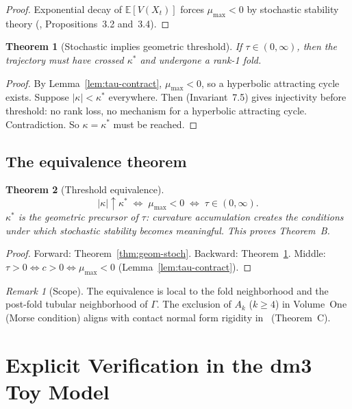 \documentclass[12pt, oneside]{book}
\theoremstyle{plain}
\newtheorem{theorem}{Theorem}[section]
\theoremstyle{definition}
\theoremstyle{remark}
\newtheorem{remark}{Remark}[section]
\newcommand{\Orb}{\Gamma}
\begin{document}
\begin{proof}
Exponential decay of $\mathbb{E}[V(X_t)]$ forces $\mu_{\max}<0$
by stochastic stability theory
(\cite{Paper1}, Propositions~3.2 and~3.4).
\end{proof}

\begin{theorem}[Stochastic implies geometric threshold]
\label{thm:stoch-geom}
If $\tau\in(0,\infty)$, then the trajectory must have crossed
$\kappa^*$ and undergone a rank-1 fold.
\end{theorem}

\begin{proof}
By Lemma~\ref{lem:tau-contract}, $\mu_{\max}<0$, so a hyperbolic
attracting cycle exists. Suppose $|\kappa|<\kappa^*$ everywhere.
Then \cite{PO1} (Invariant~7.5) gives injectivity before threshold:
no rank loss, no mechanism for a hyperbolic attracting cycle.
Contradiction. So $\kappa=\kappa^*$ must be reached.
\end{proof}

\subsection{The equivalence theorem}

\begin{theorem}[Threshold equivalence]
\label{thm:equiv}
\[
  |\kappa|\uparrow\kappa^*
  \;\iff\;
  \mu_{\max}<0
  \;\iff\;
  \tau\in(0,\infty).
\]
$\kappa^*$ is the geometric precursor of $\tau$: curvature
accumulation creates the conditions under which stochastic
stability becomes meaningful. This proves Theorem~B.
\end{theorem}

\begin{proof}
Forward: Theorem~\ref{thm:geom-stoch}.
Backward: Theorem~\ref{thm:stoch-geom}.
Middle: $\tau>0\iff c>0\iff\mu_{\max}<0$
(Lemma~\ref{lem:tau-contract}).
\end{proof}

\begin{remark}[Scope]
The equivalence is local to the fold neighborhood and the
post-fold tubular neighborhood of $\Orb$. The exclusion of
$A_k$ ($k\ge 4$) in Volume~One (Morse condition) aligns with
contact normal form rigidity in~\cite{Paper1} (Theorem~C).
\end{remark}

\section{Explicit Verification in the dm3 Toy Model}
\label{sec:verification}
\end{document}

